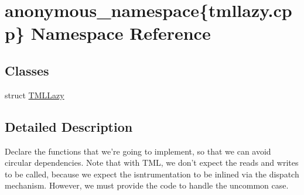 \hypertarget{namespaceanonymous__namespace_02tmllazy_8cpp_03}{\section{anonymous\-\_\-namespace\{tmllazy.\-cpp\} Namespace Reference}
\label{namespaceanonymous__namespace_02tmllazy_8cpp_03}
}
\subsection*{Classes}
\begin{DoxyCompactItemize}
\item 
struct \hyperlink{structanonymous__namespace_02tmllazy_8cpp_03_1_1TMLLazy}{T\-M\-L\-Lazy}
\end{DoxyCompactItemize}


\subsection{Detailed Description}
Declare the functions that we're going to implement, so that we can avoid circular dependencies. Note that with T\-M\-L, we don't expect the reads and writes to be called, because we expect the isntrumentation to be inlined via the dispatch mechanism. However, we must provide the code to handle the uncommon case. 